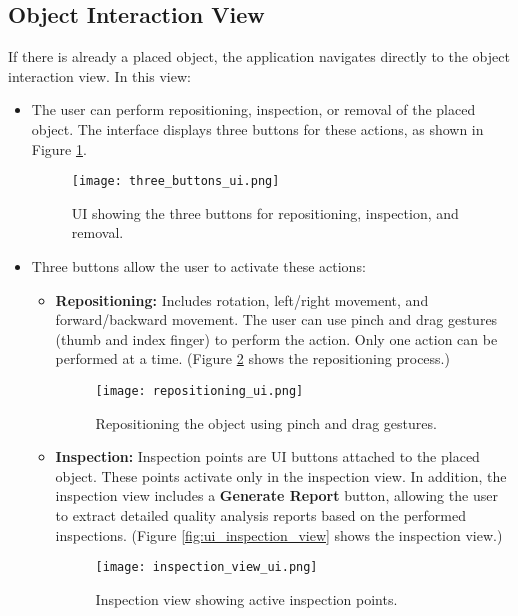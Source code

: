 \subsection{Object Interaction View}
If there is already a placed object, the application navigates directly to the object interaction view. In this view:
\begin{itemize}
    \item The user can perform repositioning, inspection, or removal of the placed object. The interface displays three buttons for these actions, as shown in Figure \ref{fig:ui_three_buttons}.
    \begin{figure}[h!]
        \centering
        \texttt{[image: three\_buttons\_ui.png]} %
        \caption{UI showing the three buttons for repositioning, inspection, and removal.}
        \label{fig:ui_three_buttons}
    \end{figure}
    \clearpage
    \item Three buttons allow the user to activate these actions:
    \begin{itemize}
        \item \textbf{Repositioning:} Includes rotation, left/right movement, and forward/backward movement. The user can use pinch and drag gestures (thumb and index finger) to perform the action. Only one action can be performed at a time. (Figure \ref{fig:ui_repositioning} shows the repositioning process.)
        \begin{figure}[h!]
            \centering
            \texttt{[image: repositioning\_ui.png]} %
            \caption{Repositioning the object using pinch and drag gestures.}
            \label{fig:ui_repositioning}
        \end{figure}
        \item \textbf{Inspection:} Inspection points are UI buttons attached to the placed object. These points activate only in the inspection view. In addition, the inspection view includes a \textbf{Generate Report} button, allowing the user to extract detailed quality analysis reports based on the performed inspections. (Figure \ref{fig:ui_inspection_view} shows the inspection view.)
        \clearpage
        \begin{figure}[h!]
            \centering
            \texttt{[image: inspection\_view\_ui.png]} %
            \caption{Inspection view showing active inspection points.}

\end{figure}
\end{itemize}
\end{itemize}
